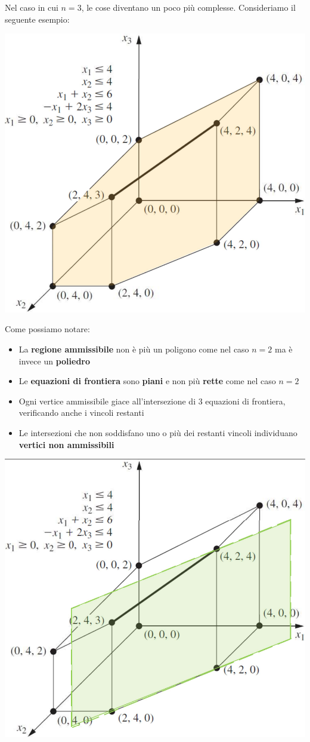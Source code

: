 \documentclass[12pt]{article}
\begin{document}
Nel caso in cui $n = 3$, le cose diventano un poco più complesse. Consideriamo il seguente esempio:
\begin{center}
    \includegraphics[width = 0.60\linewidth]{Images/38.png}
\end{center}
Come possiamo notare:
\begin{itemize}
    \item La \textbf{regione ammissibile} non è più un poligono come nel caso $n = 2$ ma è invece un \textbf{poliedro}
    \item Le \textbf{equazioni di frontiera} sono \textbf{piani} e non più \textbf{rette} come nel caso $n = 2$
    \item Ogni vertice ammissibile giace all'intersezione di 3 equazioni di frontiera, verificando anche i vincoli restanti
    \item Le intersezioni che non soddisfano uno o più dei restanti vincoli individuano \textbf{vertici non ammissibili}
\end{itemize}
\begin{center}
    \includegraphics[width = 0.60\linewidth]{Images/39.png}
\end{center}
\end{document}
